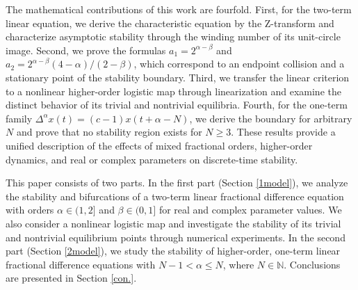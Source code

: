 \documentclass[11pt,a4paper]{article}
\theoremstyle{definition}
\begin{document}
\par The mathematical contributions of this work are fourfold. First, for the two-term linear equation, we derive the characteristic equation by the Z-transform and characterize asymptotic stability through the winding number of its unit-circle image. Second, we prove the formulas $a_1 = 2^{\alpha-\beta}$ and $a_2 = 2^{\alpha-\beta}(4 - \alpha)/(2 - \beta)$, which correspond to an endpoint collision and a stationary point of the stability boundary. Third, we transfer the linear criterion to a nonlinear higher-order logistic map through linearization and examine the distinct behavior of its trivial and nontrivial equilibria. Fourth, for the one-term family $\Delta^\alpha x(t) = (c - 1)x(t + \alpha - N)$, we derive the boundary for arbitrary $N$ and prove that no stability region exists for $N \geq 3$. These results provide a unified description of the effects of mixed fractional orders, higher-order dynamics, and real or complex parameters on discrete-time stability.

\par This paper consists of two parts. In the first part (Section \ref{1model}), we analyze the stability and bifurcations of a two-term linear fractional difference equation with orders $\alpha \in (1,2]$ and $\beta \in (0,1]$ for real and complex parameter values. We also consider a nonlinear logistic map and investigate the stability of its trivial and nontrivial equilibrium points through numerical experiments. In the second part (Section \ref{2model}), we study the stability of higher-order, one-term linear fractional difference equations with $N - 1 < \alpha \leq N$, where $N \in \mathbb{N}$. Conclusions are presented in Section \ref{con.}.

\end{document}
